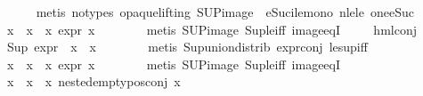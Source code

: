 \begin{isabellebody}
\ \ \ \ \isamarkupfalse%
\ {\isacharparenleft}{\kern0pt}metis\ {\isacharparenleft}{\kern0pt}no{\isacharunderscore}{\kern0pt}types{\isacharcomma}{\kern0pt}\ opaque{\isacharunderscore}{\kern0pt}lifting{\isacharparenright}{\kern0pt}\ SUP{\isacharunderscore}{\kern0pt}image\ \ eSuc{\isacharunderscore}{\kern0pt}ile{\isacharunderscore}{\kern0pt}mono\ nle{\isacharunderscore}{\kern0pt}le\ one{\isacharunderscore}{\kern0pt}eSuc{\isacharparenright}{\kern0pt}\isanewline
\ \ \isamarkupfalse%
\ {\isachardoublequoteopen}{\isasymforall}x\ {\isasymin}\ x{}\ {\isacharbackquote}{\kern0pt}\ x{}{\isachardot}{\kern0pt}\ expr{\isacharunderscore}{\kern0pt}{}\ x\ {\isasymle}\ {}{\isachardoublequoteclose}\isanewline
\ \ \ \ \isamarkupfalse%
\ {\isacharparenleft}{\kern0pt}metis\ SUP{\isacharunderscore}{\kern0pt}image\ Sup{\isacharunderscore}{\kern0pt}le{\isacharunderscore}{\kern0pt}iff\ image{\isacharunderscore}{\kern0pt}eqI{\isacharparenright}{\kern0pt}\ \isanewline
\ \ \isamarkupfalse%
\ hml{\isacharunderscore}{\kern0pt}conj\ \isamarkupfalse%
\ {\isachardoublequoteopen}Sup\ {\isacharparenleft}{\kern0pt}{\isacharparenleft}{\kern0pt}expr{\isacharunderscore}{\kern0pt}{}\ {\isasymcirc}\ x{}{\isacharparenright}{\kern0pt}\ {\isacharbackquote}{\kern0pt}\ x{}{\isacharparenright}{\kern0pt}\ {\isasymle}\ {}{\isachardoublequoteclose}\isanewline
\ \ \ \ \isamarkupfalse%
\ {\isacharparenleft}{\kern0pt}metis\ Sup{\isacharunderscore}{\kern0pt}union{\isacharunderscore}{\kern0pt}distrib\ expr{\isacharunderscore}{\kern0pt}{}{\isacharunderscore}{\kern0pt}conj\ le{\isacharunderscore}{\kern0pt}sup{\isacharunderscore}{\kern0pt}iff{\isacharparenright}{\kern0pt}\isanewline
\ \ \isamarkupfalse%
\ {\isachardoublequoteopen}{\isasymforall}x\ {\isasymin}\ x{}\ {\isacharbackquote}{\kern0pt}\ x{}{\isachardot}{\kern0pt}\ expr{\isacharunderscore}{\kern0pt}{}\ x\ {\isasymle}\ {}{\isachardoublequoteclose}\isanewline
\ \ \ \ \isamarkupfalse%
\ {\isacharparenleft}{\kern0pt}metis\ SUP{\isacharunderscore}{\kern0pt}image\ Sup{\isacharunderscore}{\kern0pt}le{\isacharunderscore}{\kern0pt}iff\ image{\isacharunderscore}{\kern0pt}eqI{\isacharparenright}{\kern0pt}\ \isanewline
\ \ \isamarkupfalse%
\ {\isachardoublequoteopen}{\isasymforall}x\ {\isasymin}\ x{}\ {\isacharbackquote}{\kern0pt}\ x{}{\isachardot}{\kern0pt}\ nested{\isacharunderscore}{\kern0pt}empty{\isacharunderscore}{\kern0pt}pos{\isacharunderscore}{\kern0pt}conj\ x{\isachardoublequoteclose}\isanewline

\end{isabellebody}
